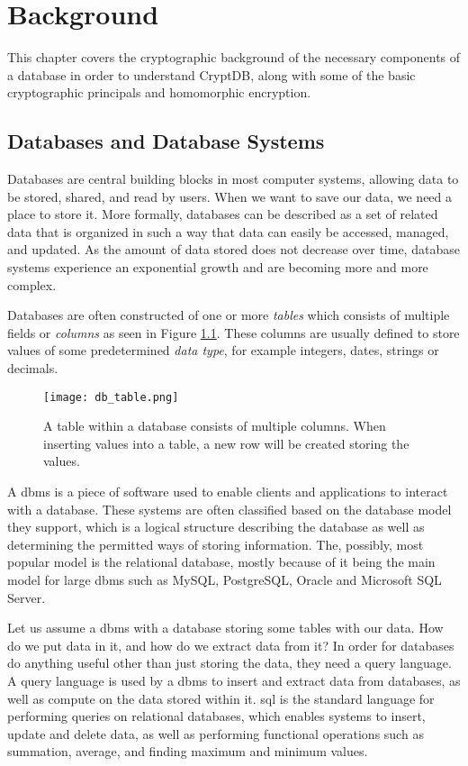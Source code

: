 \chapter{Background}
\label{chp:background}

This chapter covers the cryptographic background of the necessary components of a database in order to understand CryptDB, along with some of the basic cryptographic principals and homomorphic encryption.

\section{Databases and Database Systems}

Databases are central building blocks in most computer systems, allowing data to be stored, shared, and read by users. When we want to save our data, we need a place to store it. More formally, databases can be described as a set of related data that is organized in such a way that data can easily be accessed, managed, and updated. As the amount of data stored does not decrease over time, database systems experience an exponential growth and are becoming more and more complex.

Databases are often constructed of one or more \emph{tables} which consists of multiple fields or \emph{columns} as seen in Figure \ref{fig:db_table}. These columns are usually defined to store values of some predetermined \emph{data type}, for example integers, dates, strings or decimals. 

\begin{figure}[h]
	\centering
	\texttt{[image: db\_table.png]}
	\caption{A table within a database consists of multiple columns. When inserting values into a table, a new row will be created storing the values.}
	\label{fig:db_table}
\end{figure}

A \gls{dbms} is a piece of software used to enable clients and applications to interact with a database. These systems are often classified based on the database model they support, which is a logical structure describing the database as well as determining the permitted ways of storing information. The, possibly, most popular model is the relational database, mostly because of it being the main model for large \gls{dbms} such as MySQL, PostgreSQL, Oracle and Microsoft SQL Server.

Let us assume a \gls{dbms} with a database storing some tables with our data. How do we put data in it, and how do we extract data from it? In order for databases do anything useful other than just storing the data, they need a query language. A query language is used by a \gls{dbms} to insert and extract data from databases, as well as compute on the data stored within it. \gls{sql} is the standard language for performing queries on relational databases, which enables systems to insert, update and delete data, as well as performing functional operations such as summation, average, and finding maximum and minimum values.

